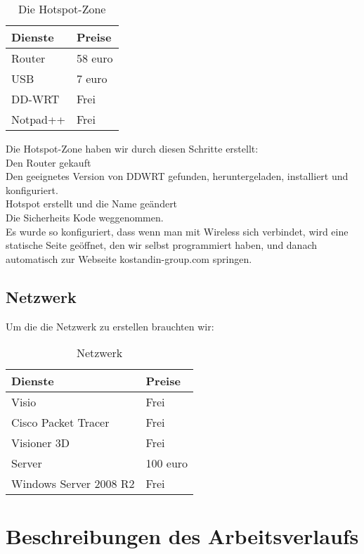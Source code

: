 \begin{table}[ht]
\caption{Die Hotspot-Zone}
\hspace*{-2cm}
\begin{tabular}{l l}
\hline\hline
Dienste & Preise \\ [0.5ex]
\hline
Router & 58 euro \\
\hline
USB & 7 euro \\
\hline
DD-WRT & Frei \\
\hline
Notpad++ & Frei \\
\hline
\end{tabular}
\label{table:hotspot} 
\end{table}
Die Hotspot-Zone haben wir durch diesen Schritte erstellt: \\
Den Router gekauft \\
Den geeignetes Version von DDWRT gefunden, heruntergeladen, installiert und konfiguriert. \\
Hotspot erstellt und die Name ge\"andert \\
Die Sicherheits Kode weggenommen. \\
Es wurde so konfiguriert, dass wenn man mit Wireless sich verbindet, wird eine statische Seite ge\"offnet, den wir selbst programmiert haben, und danach automatisch zur Webseite kostandin-group.com springen. \\

\subsection{Netzwerk}
Um die die Netzwerk zu erstellen brauchten wir:

\begin{table}[ht]
\caption{Netzwerk}
\hspace*{-2cm}
\begin{tabular}{l l}
\hline\hline
Dienste & Preise \\ [0.5ex]
\hline
Visio & Frei  \\
\hline
Cisco Packet Tracer & Frei \\
\hline
Visioner 3D & Frei \\
\hline
Server & 100 euro \\
\hline
Windows Server 2008 R2 & Frei \\
\hline
\end{tabular}
\label{table:hotspot} 
\end{table}


\section{Beschreibungen des Arbeitsverlaufs}

